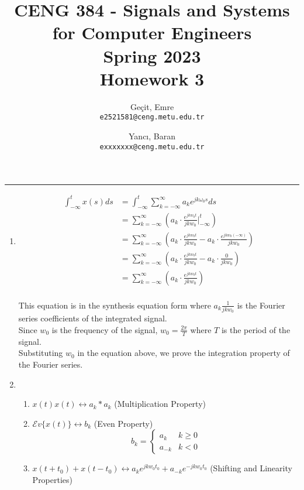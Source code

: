 \documentclass[10pt,a4paper, margin=1in]{article}
\author{
  Geçit, Emre\\
  \texttt{e2521581@ceng.metu.edu.tr}
  \and
  Yancı, Baran\\
  \texttt{exxxxxxx@ceng.metu.edu.tr}
}
\title{CENG 384 - Signals and Systems for Computer Engineers \\
Spring 2023 \\
Homework 3}
\begin{document}
\maketitle



\noindent\rule{19cm}{1.2pt}

\begin{enumerate}

\item \begin{align*}
    \int_{-\infty}^t x(s) ds &= \int_{-\infty}^{t} \sum_{k=-\infty}^{\infty} a_k e^{jk\omega_0 s} ds\\
    &= \sum_{k=-\infty}^{\infty} (a_k \cdot \frac{e^{jkw_0t}}{jkw_0} \Big|_{-\infty}^{t})\\
    &= \sum_{k=-\infty}^{\infty} (a_k \cdot \frac{e^{jkw_0t}}{jkw_0} - a_k \cdot \frac{e^{jkw_0 (-\infty)}}{jkw_0})\\
    &= \sum_{k=-\infty}^{\infty} (a_k \cdot \frac{e^{jkw_0t}}{jkw_0} - a_k \cdot \frac{0}{jkw_0})\\
    &= \sum_{k=-\infty}^{\infty} (a_k \cdot \frac{e^{jkw_0t}}{jkw_0})\\
\end{align*}

This equation is in the synthesis equation form where $a_k \frac{1}{jkw_0}$ is the Fourier series coefficients of the integrated signal.\\

Since $w_0$ is the frequency of the signal, $w_0 = \frac{2\pi}{T}$ where $T$ is the period of the signal.\\

Substituting $w_0$ in the equation above, we prove the integration property of the Fourier series.\\

\item %
	\begin{enumerate}
    \item $x(t)x(t) \leftrightarrow a_k \ast a_k$ (Multiplication Property)
    \item $\mathcal{E}v\{x(t)\} \leftrightarrow b_k$ (Even Property) \[b_k= \begin{cases}
        a_k & k \geq 0 \\
        a_{-k} & k < 0
    \end{cases} \]
    \item $x(t+t_0) + x(t-t_0) \leftrightarrow a_k e^{jkw_0t_0} + a_{-k} e^{-jkw_0t_0} $ (Shifting and Linearity Properties)
    \end{enumerate}


\end{enumerate}
\end{document}
